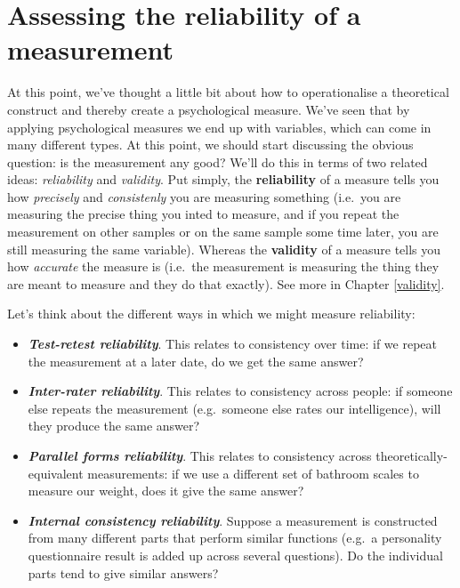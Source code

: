 \documentclass[
]{book}
\providecommand{\tightlist}{%
  \setlength{\itemsep}{0pt}\setlength{\parskip}{0pt}}
\theoremstyle{definition}
\theoremstyle{definition}
\theoremstyle{definition}
\theoremstyle{definition}
\theoremstyle{remark}
\begin{document}
\hypertarget{reliability}{%
\section{Assessing the reliability of a measurement}\label{reliability}}

At this point, we've thought a little bit about how to operationalise a theoretical construct and thereby create a psychological measure. We've seen that by applying psychological measures we end up with variables, which can come in many different types. At this point, we should start discussing the obvious question: is the measurement any good? We'll do this in terms of two related ideas: \emph{reliability} and \emph{validity}. Put simply, the \textbf{reliability} of a measure tells you how \emph{precisely} and \emph{consistenly} you are measuring something (i.e.~you are measuring the precise thing you inted to measure, and if you repeat the measurement on other samples or on the same sample some time later, you are still measuring the same variable). Whereas the \textbf{validity} of a measure tells you how \emph{accurate} the measure is (i.e.~the measurement is measuring the thing they are meant to measure and they do that exactly). See more in Chapter \ref{validity}.

Let's think about the different ways in which we might measure reliability:

\begin{itemize}
\tightlist
\item
  \textbf{\emph{Test-retest reliability}}. This relates to consistency over time: if we repeat the measurement at a later date, do we get the same answer?
\item
  \textbf{\emph{Inter-rater reliability}}. This relates to consistency across people: if someone else repeats the measurement (e.g.~someone else rates our intelligence), will they produce the same answer?
\item
  \textbf{\emph{Parallel forms reliability}}. This relates to consistency across theoretically-equivalent measurements: if we use a different set of bathroom scales to measure our weight, does it give the same answer?
\item
  \textbf{\emph{Internal consistency reliability}}. Suppose a measurement is constructed from many different parts that perform similar functions (e.g.~a personality questionnaire result is added up across several questions). Do the individual parts tend to give similar answers?
\end{itemize}
\end{document}

